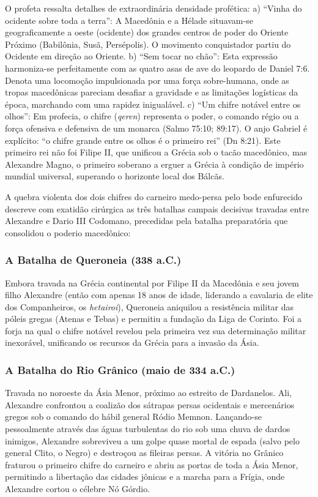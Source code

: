 O profeta ressalta detalhes de extraordinária densidade profética:
a) ``Vinha do ocidente sobre toda a terra'': A Macedônia e a Hélade situavam-se geograficamente a oeste (ocidente) dos grandes centros de poder do Oriente Próximo (Babilônia, Susã, Persépolis). O movimento conquistador partiu do Ocidente em direção ao Oriente.
b) ``Sem tocar no chão'': Esta expressão harmoniza-se perfeitamente com as quatro asas de ave do leopardo de Daniel 7:6. Denota uma locomoção impulsionada por uma força sobre-humana, onde as tropas macedônicas pareciam desafiar a gravidade e as limitações logísticas da época, marchando com uma rapidez inigualável.
c) ``Um chifre notável entre os olhos'': Em profecia, o chifre (\textit{qeren}) representa o poder, o comando régio ou a força ofensiva e defensiva de um monarca (Salmo 75:10; 89:17). O anjo Gabriel é explícito: ``o chifre grande entre os olhos é o primeiro rei'' (Dn 8:21). Este primeiro rei não foi Filipe II, que unificou a Grécia sob o tacão macedônico, mas Alexandre Magno, o primeiro soberano a erguer a Grécia à condição de império mundial universal, superando o horizonte local dos Bálcãs.

A quebra violenta dos dois chifres do carneiro medo-persa pelo bode enfurecido descreve com exatidão cirúrgica as três batalhas campais decisivas travadas entre Alexandre e Dario III Codomano, precedidas pela batalha preparatória que consolidou o poderio macedônico:


\subsubsection*{A Batalha de Queroneia (338 a.C.)}
Embora travada na Grécia continental por Filipe II da Macedônia e seu jovem filho Alexandre (então com apenas 18 anos de idade, liderando a cavalaria de elite dos Companheiros, os \textit{hetairoi}), Queroneia aniquilou a resistência militar das póleis gregas (Atenas e Tebas) e permitiu a fundação da Liga de Corinto. Foi a forja na qual o chifre notável revelou pela primeira vez sua determinação militar inexorável, unificando os recursos da Grécia para a invasão da Ásia.


\subsubsection*{A Batalha do Rio Grânico (maio de 334 a.C.)}
Travada no noroeste da Ásia Menor, próximo ao estreito de Dardanelos. Ali, Alexandre confrontou a coalizão dos sátrapas persas ocidentais e mercenários gregos sob o comando do hábil general Ródio Memnon. Lançando-se pessoalmente através das águas turbulentas do rio sob uma chuva de dardos inimigos, Alexandre sobreviveu a um golpe quase mortal de espada (salvo pelo general Clito, o Negro) e destroçou as fileiras persas. A vitória no Grânico fraturou o primeiro chifre do carneiro e abriu as portas de toda a Ásia Menor, permitindo a libertação das cidades jônicas e a marcha para a Frígia, onde Alexandre cortou o célebre Nó Górdio.


